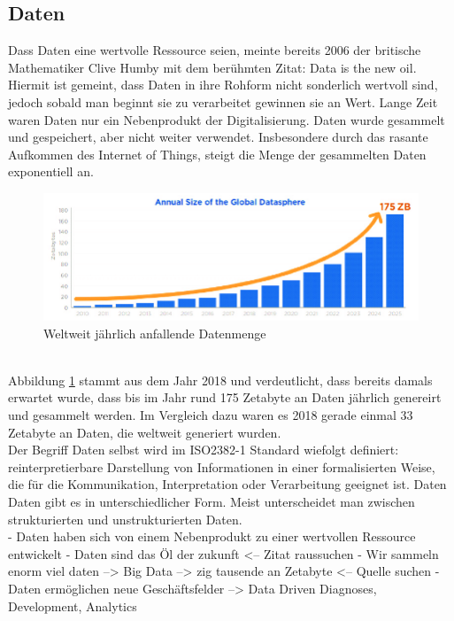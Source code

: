 \begin{onehalfspace}
    \subsection{Daten}
    \label{subsubsec:daten}
        Dass Daten eine wertvolle Ressource seien, meinte bereits 2006 der britische Mathematiker Clive Humby mit dem berühmten Zitat: \glqq{}Data is the new oil\grqq{}. Hiermit ist gemeint, dass Daten in ihre Rohform nicht sonderlich wertvoll sind, jedoch sobald man beginnt sie zu verarbeitet gewinnen sie an Wert. Lange Zeit waren Daten nur ein Nebenprodukt der Digitalisierung. Daten wurde gesammelt und gespeichert, aber nicht weiter verwendet. Insbesondere durch das rasante Aufkommen des Internet of Things, steigt  die Menge der gesammelten Daten exponentiell an.\cite{Otto2019}
        \begin{figure}[h]
            \centering
            \includegraphics[width = 15cm]{Bilder/Annual_Data_Size.png}
            \caption{Weltweit jährlich anfallende Datenmenge \cite{Reinsel2018}}
            \label{fig:DataSize}
        \end{figure} 
        \\
        Abbildung \ref{fig:DataSize} stammt aus dem Jahr 2018 und verdeutlicht, dass bereits damals erwartet wurde, dass bis im Jahr rund 175 Zetabyte an Daten jährlich genereirt und gesammelt werden. Im Vergleich dazu waren es 2018 gerade einmal 33 Zetabyte an Daten, die weltweit generiert wurden. \cite{Reinsel2018}
        \\
        Der Begriff Daten selbst wird im ISO2382-1 Standard wiefolgt definiert: \glqq{}reinterpretierbare Darstellung von Informationen in einer formalisierten Weise, die für die Kommunikation, Interpretation oder Verarbeitung geeignet ist\grqq{}. \cite{ISO2382} Daten Daten gibt es in unterschiedlicher Form. Meist unterscheidet man zwischen strukturierten und unstrukturierten Daten. 
        \\
        - Daten haben sich von einem Nebenprodukt zu einer wertvollen Ressource entwickelt
        - Daten sind das Öl der zukunft <-- Zitat raussuchen
        - Wir sammeln enorm viel daten --> Big Data --> zig tausende an Zetabyte <-- Quelle suchen
        - Daten ermöglichen neue Geschäftsfelder --> Data Driven Diagnoses, Development, Analytics


\end{onehalfspace}

